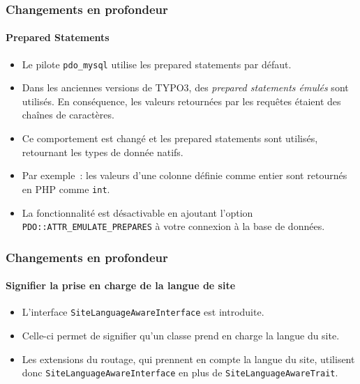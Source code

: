 \begin{frame}[fragile]
	\frametitle{Changements en profondeur}
	\framesubtitle{Prepared Statements}

	\lstset{basicstyle=\tiny\ttfamily}

	\begin{itemize}
		\item Le pilote \texttt{pdo\_mysql} utilise les prepared statements par défaut.
		\item Dans les anciennes versions de TYPO3, des \textit{prepared statements émulés} sont utilisés.
			En conséquence, les valeurs retournées par les requêtes étaient des chaînes de caractères.
		\item Ce comportement est changé et les prepared statements sont utilisés,
			retournant les types de donnée natifs.
		\item Par exemple~: les valeurs d'une colonne définie comme entier sont retournés en PHP comme \texttt{int}.
		\item La fonctionnalité est désactivable en ajoutant l'option
			\texttt{PDO::ATTR\_EMULATE\_PREPARES} à votre connexion à la base de données.

	\end{itemize}

\end{frame}


\begin{frame}[fragile]
	\frametitle{Changements en profondeur}
	\framesubtitle{Signifier la prise en charge de la langue de site}

	\lstset{basicstyle=\tiny\ttfamily}


	\begin{itemize}
		\item L'interface \texttt{SiteLanguageAwareInterface} est introduite.
		\item Celle-ci permet de signifier qu'un classe prend en charge la langue du site.
		\item Les extensions du routage, qui prennent en compte la langue du site,
			utilisent donc \texttt{SiteLanguageAwareInterface}
			en plus de \texttt{SiteLanguageAwareTrait}.
	\end{itemize}

\end{frame}

